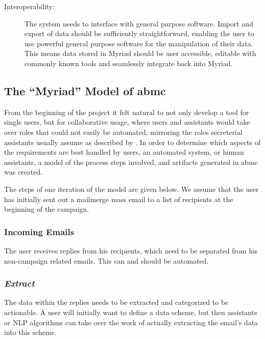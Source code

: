 \begin{description}

\item[Interoperability:] The system needs to interface with general purpose software. Import and export of data should be sufficiently straightforward, enabling the user to use powerful general purpose software for the manipulation of their data. This means data stored in Myriad should be user accessible, editable with commonly known tools and seamlessly integrate back into Myriad. 

\end{description}

\subsection{The ``Myriad'' Model of \gls{abmc}}

From the beginning of the project it felt natural to not only develop a tool for single users, but for collaborative usage, where users and assistants would take over roles that could not easily be automated, mirroring the roles secreterial assistants usually assume as described by \citet{Erickson2008a}.
In order to determine which aspects of the requirements are best handled by users, an automated system, or human assistants, a model of the process steps involved, and artifacts generated in \gls{abmc} was created.


The steps of one iteration of the model are given below. We assume that the user has initially sent out a mailmerge mass email to a list of recipients at the beginning of the campaign.

\subsubsection*{Incoming Emails}

The user receives replies from his recipients, which need to be separated from his non-campaign related emails. This can and should be automated.

\subsubsection*{\emph{Extract}}

The data within the replies needs to be extracted and categorized to be actionable. A user will initially want to define a data scheme, but then assistants or NLP algorithms can take over the work of actually extracting the email's data into this scheme.

